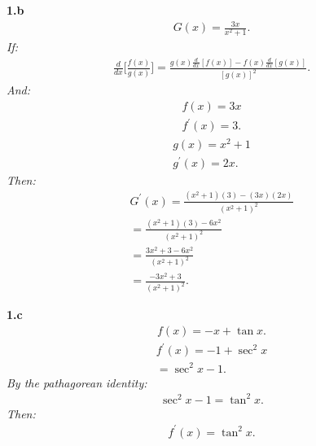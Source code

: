 \documentclass{report}
\begin{document}
    \pagebreak \bigbreak \noindent
    \begin{mdframed}
        \textbf{1.b}
        \begin{align*}
            G(x) = \frac{3x}{x^{2}+1}
        .\end{align*}
        \bigbreak \noindent 
        \bigbreak \noindent 
        \textit{If:}
        \begin{align*}
            \frac{d}{dx}\bigg[ \frac{f(x)}{g(x)}\bigg] = \frac{g(x) \frac{d}{dx}[f(x)] - f(x) \frac{d}{dx}[g(x)]}{[g(x)]^2}
        .\end{align*}
        \bigbreak \noindent 
        \textit{And:}
        \begin{align*}
            f(x) = 3x \\
            f^{\prime}(x) = 3
        .\end{align*}
        \begin{align*}
            g(x) = x^{2} + 1 \\
            g^{\prime}(x) = 2x
        .\end{align*}
        \bigbreak \noindent 
        \textit{Then:}
        \begin{align*}
            G^{\prime}(x) = \frac{(x^{2}+1)(3) - (3x)(2x)}{(x^{2}+1)^{2}} \\
            =\frac{(x^{2}+1)(3)-6x^{2}}{(x^{2}+1)^{2}} \\ 
            = \frac{3x^{2}+3-6x^{2}}{(x^{2}+1)^{2}} \\
            = \boxed{\frac{-3x^{2}+3}{(x^{2}+1)^{2}}}
        .\end{align*}
    \end{mdframed}

    \bigbreak \noindent 
    \begin{mdframed}
        \textbf{1.c}
        \begin{align*}
            f(x) = -x + \tan{x}
        .\end{align*}
        \begin{align*}
            f^{\prime}(x) = -1 + \sec^{2}{x} \\ 
            = \sec^{2}{x}  - 1
        .\end{align*}
        \bigbreak \noindent 
        \textit{By the pathagorean identity:}
        \begin{align*}
            \sec^{2}{x} - 1 = \tan^{2}{x}
        .\end{align*}
        \textit{Then:}
        \begin{align*}
          \boxed{f^{\prime}(x) = \tan^{2}{x}}
        .\end{align*}
    \end{mdframed}
\end{document}

